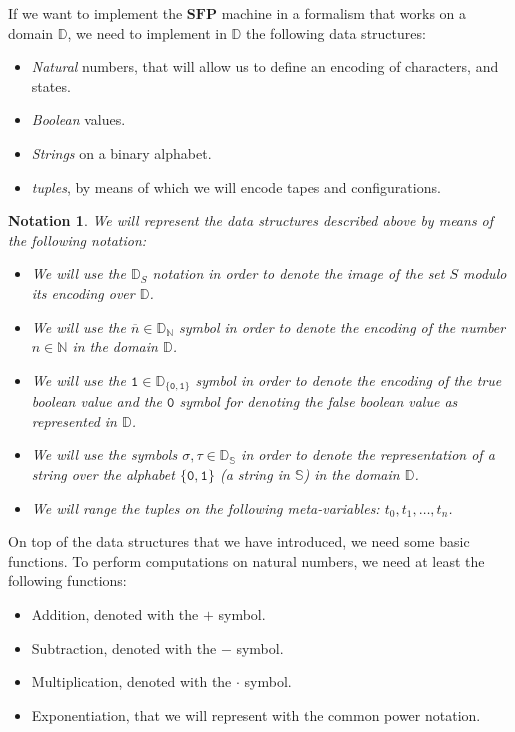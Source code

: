 \documentclass[10pt]{amsart}
\newcommand{\SFP}{\mathbf{SFP}}
\newcommand{\zero}{\mathtt{0}}
\newcommand{\one}{\mathtt{1}}
\newcommand{\NN}{\mathbb{N}}
\renewcommand{\SS}{\mathbb{S}}
\newcommand{\DD}{\mathbb{D}}
\newcommand{\mti}[1]{t{_#1}}
\newcommand{\sone}{\sigma}
\newcommand{\stwo}{\tau}
\newtheorem{notation}{Notation}
\begin{document}
If we want to implement the $\SFP$ machine in a formalism that works on a domain $\DD$, we need to implement in $\DD$ the following data structures:

\begin{itemize}
\item \emph{Natural} numbers, that will allow us to define an encoding of characters, and states.
\item \emph{Boolean} values.
\item \emph{Strings} on a binary alphabet.
\item \emph{tuples}, by means of which we will encode tapes and configurations.
\end{itemize}

\begin{notation}
We will represent the data structures described above by means of the following notation:
\begin{itemize}
\item We will use the $\DD_S$ notation in order to denote the image of the set $S$ modulo its encoding over $\DD$.
\item We will use the $\overline n \in \DD_\NN$ symbol in order to denote the encoding of the number $n\in \NN$ in the domain $\DD$.
\item We will use the $\one\in \DD_{\{\zero, \one\}}$ symbol in order to denote the encoding of the true boolean value and the $\zero$ symbol for denoting the false boolean value as represented in $\DD$.
\item We will use the symbols $\sone, \stwo \in \DD_\SS$ in order to denote the representation of a string over the alphabet $\{\zero, \one\}$ (a string in $\SS$) in the domain $\DD$.
\item We will range the tuples on the following meta-variables: $\mti0, \mti1, \ldots ,\mti n$.
\end{itemize}
\end{notation}


On top of the data structures that we have introduced, we need some basic functions. To perform computations on natural numbers, we need at least the following functions:

\begin{itemize}
\item Addition, denoted with the $+$ symbol.
\item Subtraction, denoted with the $-$ symbol.
\item Multiplication, denoted with the $\cdot$ symbol.
\item Exponentiation, that we will represent with the common power notation.
\end{itemize}
\end{document}
